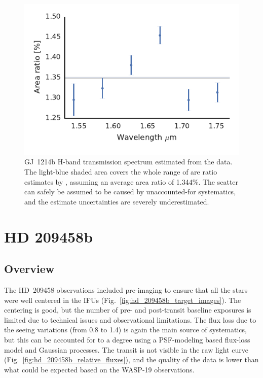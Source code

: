 \documentclass[useAMS,usenatbib]{mn2e}
\begin{document}
\begin{figure}
 \centering
 \includegraphics[width=\columnwidth]{gj_1214_h_transmission_spectrum_a.pdf}
 \caption{GJ~1214b H-band transmission spectrum estimated from the data. The light-blue shaded area covers
  the whole range of are ratio estimates by \citet{Kreidberg2013}, assuming an average area ratio of 1.344\%. The
  scatter can safely be assumed to be caused by unaccounted-for systematics, and the estimate uncertainties
  are severely underestimated.}
 \label{fig:gj_1215_h_transmission_spectrum}
\end{figure}

\section{HD 209458b}
\label{sec:hd_209458}

\subsection{Overview}
\label{sec:hd_209458:overview}

The HD~209458 observations included pre-imaging to ensure that all the stars were well centered in the IFUs 
(Fig.~\ref{fig:hd_209458b_target_images}). The centering is good, but the number of pre- and post-transit baseline 
exposures is limited due to technical issues and observational limitations. The flux loss due to the seeing 
variations (from 0.8\arcsec{} to 1.4\arcsec{}) is again the main source of systematics, but this can be accounted for 
to a degree using a PSF-modeling based flux-loss model and Gaussian processes. The transit is not visible in the raw 
light curve (Fig.~\ref{fig:hd_209458b_relative_fluxes}), and the quality of the data is lower than what could be 
expected based on the WASP-19 observations.
\end{document}
